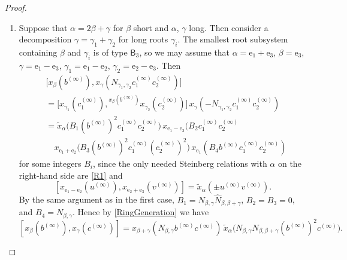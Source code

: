 \documentclass{article}
\numberwithin{equation}{section}
\theoremstyle{definition}
\theoremstyle{remark}
\newcommand{\up}[2]{{^{#1}\!{#2}}}
\newcommand{\rB}{\mathsf{B}}
\begin{document}
\begin{proof}
\begin{enumerate}
 \item Suppose that \(\alpha = 2\beta + \gamma\) for \(\beta\) short and \(\alpha\), \(\gamma\) long. Then consider a decomposition \(\gamma = \gamma_1 + \gamma_2\) for long roots \(\gamma_i\). The smallest root subsystem containing \(\beta\) and \(\gamma_i\) is of type \(\rB_3\), so we may assume that \(\alpha = \mathrm e_1 + \mathrm e_3\), \(\beta = \mathrm e_3\), \(\gamma = \mathrm e_1 - \mathrm e_3\), \(\gamma_1 = \mathrm e_1 - \mathrm e_2\), \(\gamma_2 = \mathrm e_2 - \mathrm e_3\). Then
 \begin{align*}
  &\bigl[x_\beta(b^{(\infty)}),
   x_\gamma(N_{\gamma_1, \gamma_2} c_1^{(\infty)} c_2^{(\infty)})\bigr]\\
  &= \bigl[x_{\gamma_1}(c_1^{(\infty)}),
  \up{x_\beta(b^{(\infty)})}
   {x_{\gamma_2}(c_2^{(\infty)})}\bigr]\,
  x_\gamma(-N_{\gamma_1, \gamma_2} c_1^{(\infty)} c_2^{(\infty)})\\
  &= \widetilde x_\alpha\bigl(B_1 (b^{(\infty)})^2 c_1^{(\infty)} c_2^{(\infty)}\bigr)\,
  x_{\mathrm e_1 - \mathrm e_3}(B_2 c_1^{(\infty)} c_2^{(\infty)}\\
  &\quad x_{\mathrm e_1 + \mathrm e_2}\bigl(B_3 (b^{(\infty)})^2 c_1^{(\infty)} (c_2^{(\infty)})^2\bigr)\,
  x_{\mathrm e_1}(B_4 b^{(\infty)} c_1^{(\infty)} c_2^{(\infty)})
 \end{align*}
 for some integers \(B_i\), since the only needed Steinberg relations with \(\alpha\) on the right-hand side are \eqref{R1} and
 \[[x_{\mathrm e_1 - \mathrm e_2}(u^{(\infty)}), x_{\mathrm e_2 + \mathrm e_3}(v^{(\infty)})] = \widetilde x_\alpha(\pm u^{(\infty)} v^{(\infty)}).\]
 By the same argument as in the first case, \(B_1 = N_{\beta, \gamma} \widehat N_{\beta, \beta + \gamma}\), \(B_2 = B_3 = 0\), and \(B_4 = N_{\beta, \gamma}\). Hence by \cref{RingGeneration} we have
 \[[x_\beta(b^{(\infty)}), x_\gamma(c^{(\infty)})]
 = x_{\beta + \gamma}(N_{\beta, \gamma} b^{(\infty)} c^{(\infty)})\,
 \widetilde x_\alpha\bigl(N_{\beta, \gamma} \widehat N_{\beta, \beta + \gamma} (b^{(\infty)})^2 c^{(\infty)}\bigr).\]


\end{enumerate}
\end{proof}
\end{document}
